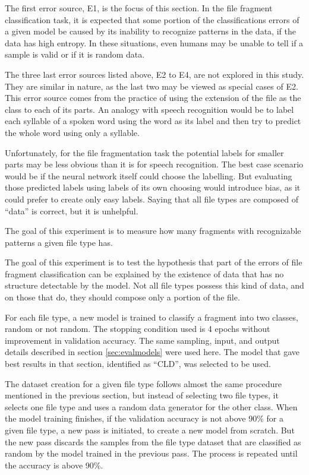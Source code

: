 The first error source, E1, is the focus of this section. In the file fragment classification task, it is expected that some portion of the classifications errors of a given model be caused by its inability to recognize patterns in the data, if the data has high entropy. In these situations, even humans may be unable to tell if a sample is valid or if it is random data.

The three last error sources listed above, E2 to E4, are not explored in this study. They are similar in nature, as the last two may be viewed as special cases of E2. This error source comes from the practice of using the extension of the file as the class to each of its parts. An analogy with speech recognition would be to label each syllable of a spoken word using the word as its label and then try to predict the whole word using only a syllable.

Unfortunately, for the file fragmentation task the potential labels for smaller parts may be less obvious than it is for speech recognition. The best case scenario would be if the neural network itself could choose the labelling. But evaluating those predicted labels using labels of its own choosing would introduce bias, as it could prefer to create only easy labels. Saying that all file types are composed of ``data'' is correct, but it is unhelpful.

The goal of this experiment is to measure how many fragments with recognizable patterns a given file type has.

The goal of this experiment is to test the hypothesis that part of the errors of file fragment classification  can be explained by the existence of data that has no structure detectable by the model. Not all file types possess this kind of data, and on those that do, they should compose only a portion of the file.


For each file type, a new model is trained to classify a fragment into two classes, random or not random. The stopping condition used is 4 epochs without improvement in validation accuracy.
The same sampling, input, and output details described in section \ref{sec:evalmodels} were used here. The model that gave best results in that section, identified as ``CLD'', was selected to be used.


The dataset creation for a given file type follows almost the same procedure mentioned in the previous section, but instead of selecting two file types, it selects one file type and uses a random data generator for the other class.
When the model training finishes, if the validation accuracy is not above 90\% for a given file type, a new pass is initiated, to create a new model from scratch. But the new pass discards the samples from the file type dataset that are classified as random by the model trained in the previous pass. The process is repeated until the accuracy is above 90\%.

